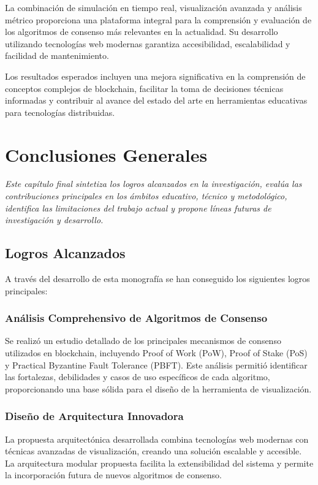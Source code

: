 \documentclass[spanish,12pt,letterpaper]{report}
\begin{document}
La combinación de simulación en tiempo real, visualización avanzada y análisis métrico proporciona una plataforma integral para la comprensión y evaluación de los algoritmos de consenso más relevantes en la actualidad. Su desarrollo utilizando tecnologías web modernas garantiza accesibilidad, escalabilidad y facilidad de mantenimiento.

Los resultados esperados incluyen una mejora significativa en la comprensión de conceptos complejos de blockchain, facilitar la toma de decisiones técnicas informadas y contribuir al avance del estado del arte en herramientas educativas para tecnologías distribuidas.

\chapter{Conclusiones Generales}

\textit{Este capítulo final sintetiza los logros alcanzados en la investigación, evalúa las contribuciones principales en los ámbitos educativo, técnico y metodológico, identifica las limitaciones del trabajo actual y propone líneas futuras de investigación y desarrollo.}
\newpage
\section{Logros Alcanzados}

A través del desarrollo de esta monografía se han conseguido los siguientes logros principales:

\subsection{Análisis Comprehensivo de Algoritmos de Consenso}

Se realizó un estudio detallado de los principales mecanismos de consenso utilizados en blockchain, incluyendo Proof of Work (PoW), Proof of Stake (PoS) y Practical Byzantine Fault Tolerance (PBFT). Este análisis permitió identificar las fortalezas, debilidades y casos de uso específicos de cada algoritmo, proporcionando una base sólida para el diseño de la herramienta de visualización.

\subsection{Diseño de Arquitectura Innovadora}

La propuesta arquitectónica desarrollada combina tecnologías web modernas con técnicas avanzadas de visualización, creando una solución escalable y accesible. La arquitectura modular propuesta facilita la extensibilidad del sistema y permite la incorporación futura de nuevos algoritmos de consenso.
\end{document}

